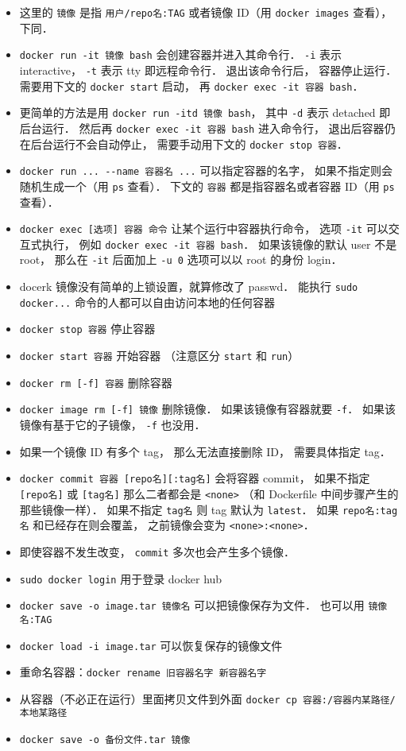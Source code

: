 \begin{itemize}
\item 这里的 \verb|镜像| 是指 \verb|用户/repo名:TAG| 或者镜像 ID（用 \verb|docker images| 查看）， 下同．
\item \verb|docker run -it 镜像 bash| 会创建容器并进入其命令行． \verb|-i| 表示 interactive， \verb|-t| 表示 tty 即远程命令行． 退出该命令行后， 容器停止运行． 需要用下文的 \verb|docker start| 启动， 再 \verb|docker exec -it 容器 bash|．
\item 更简单的方法是用 \verb|docker run -itd 镜像 bash|， 其中 \verb|-d| 表示 detached 即后台运行． 然后再 \verb|docker exec -it 容器 bash| 进入命令行， 退出后容器仍在后台运行不会自动停止， 需要手动用下文的 \verb|docker stop 容器|．
\item \verb|docker run ... --name 容器名 ...| 可以指定容器的名字， 如果不指定则会随机生成一个（用 \verb|ps| 查看）． 下文的 \verb|容器| 都是指容器名或者容器 ID（用 \verb|ps| 查看）．
\item \verb`docker exec [选项] 容器 命令` 让某个运行中容器执行命令， 选项 \verb|-it| 可以交互式执行， 例如 \verb|docker exec -it 容器 bash|． 如果该镜像的默认 user 不是 root， 那么在 \verb|-it| 后面加上 \verb|-u 0| 选项可以以 root 的身份 login．
\item docerk 镜像没有简单的上锁设置，就算修改了 passwd． 能执行 \verb`sudo docker...` 命令的人都可以自由访问本地的任何容器
\item \verb`docker stop 容器` 停止容器
\item \verb`docker start 容器` 开始容器 （注意区分 \verb|start| 和 \verb|run|）
\item \verb`docker rm [-f] 容器` 删除容器
\item \verb`docker image rm [-f] 镜像` 删除镜像． 如果该镜像有容器就要 \verb|-f|． 如果该镜像有基于它的子镜像， \verb|-f| 也没用．
\item 如果一个镜像 ID 有多个 tag， 那么无法直接删除 ID， 需要具体指定 tag．
\item \verb`docker commit 容器 [repo名][:tag名]` 会将容器 commit， 如果不指定 \verb|[repo名]| 或 \verb|[tag名]| 那么二者都会是 \verb|<none>| （和 Dockerfile 中间步骤产生的那些镜像一样）． 如果不指定 \verb|tag名| 则 tag 默认为 \verb|latest|． 如果 \verb|repo名:tag名| 和已经存在则会覆盖， 之前镜像会变为 \verb|<none>:<none>|．
\item 即使容器不发生改变， \verb|commit| 多次也会产生多个镜像．
\item \verb`sudo docker login` 用于登录 docker hub
\item \verb|docker save -o image.tar 镜像名| 可以把镜像保存为文件． 也可以用 \verb|镜像名:TAG|
\item \verb|docker load -i image.tar| 可以恢复保存的镜像文件
\item 重命名容器：\verb|docker rename 旧容器名字 新容器名字|
\item 从容器（不必正在运行）里面拷贝文件到外面 \verb|docker cp 容器:/容器内某路径/ 本地某路径|
\item \verb|docker save -o 备份文件.tar 镜像|
\end{itemize}

